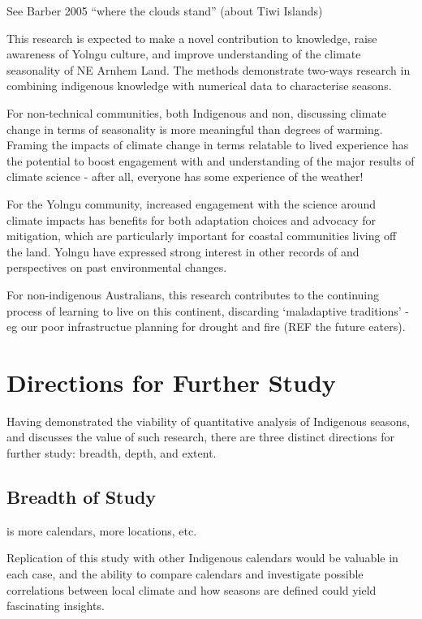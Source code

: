 See Barber 2005 ``where the clouds stand'' (about Tiwi Islands)

This research is expected to make a novel contribution to knowledge, raise
awareness of Yolngu culture, and improve understanding of the climate
seasonality of NE Arnhem Land.  The methods demonstrate two-ways research in
combining indigenous knowledge with numerical data to characterise seasons.

For non-technical communities, both Indigenous and non, discussing climate
change in terms of seasonality is more meaningful than degrees of warming.
Framing the impacts of climate change in terms relatable to lived experience
has the potential to boost engagement with and understanding of the major
results of climate science - after all, everyone has some experience of the
weather!

For the Yolngu community, increased engagement with the science around climate
impacts has benefits for both adaptation choices and advocacy for mitigation,
which are particularly important for coastal communities living off the land.
Yolngu have expressed strong interest in other records of and perspectives on
past environmental changes.

For non-indigenous Australians, this research contributes to the continuing
process of learning to live on this continent, discarding `maladaptive traditions'
- eg our poor infrastructue planning for drought and fire (REF the future eaters).



\section{Directions for Further Study}
\label{sec:further-study}

Having demonstrated the viability of quantitative analysis of Indigenous
seasons, and discusses the value of such research, there are three distinct
directions for further study:  breadth, depth, and extent.


\subsection{Breadth of Study}
is more calendars, more locations, etc.

Replication of this study with other Indigenous calendars would be
valuable in each case, and the ability to compare calendars and investigate
possible correlations between local climate and how seasons are
defined could yield fascinating insights.

